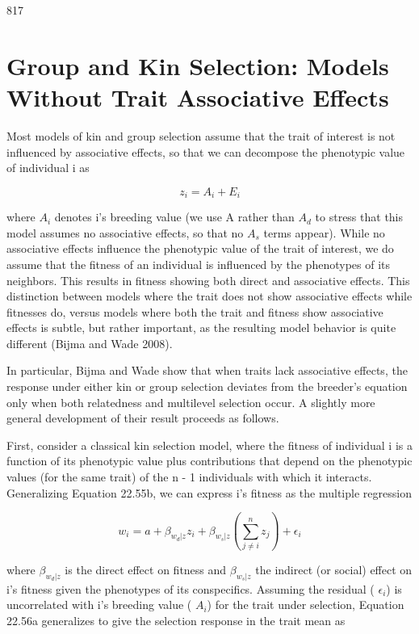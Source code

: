 \documentclass{article}
\begin{document}
817

\section{Group and Kin Selection: Models Without Trait Associative Effects}
Most models of kin and group selection assume that the trait of interest is not influenced by associative effects, so that we can decompose the phenotypic value of individual i as

\begin{equation}
z_{i}=A_{i}+E_{i}
\end{equation}

where  $ A_{i} $ denotes i's breeding value (we use A rather than  $ A_{d} $ to stress that this model assumes no associative effects, so that no  $ A_{s} $ terms appear). While no associative effects influence the phenotypic value of the trait of interest, we do assume that the fitness of an individual is influenced by the phenotypes of its neighbors. This results in fitness showing both direct and associative effects. This distinction between models where the trait does not show associative effects while fitnesses do, versus models where both the trait and fitness show associative effects is subtle, but rather important, as the resulting model behavior is quite different (Bijma and Wade 2008).

In particular, Bijma and Wade show that when traits lack associative effects, the response under either kin or group selection deviates from the breeder's equation only when both relatedness and multilevel selection occur. A slightly more general development of their result proceeds as follows.

First, consider a classical kin selection model, where the fitness of individual i is a function of its phenotypic value plus contributions that depend on the phenotypic values (for the same trait) of the n - 1 individuals with which it interacts. Generalizing Equation 22.55b, we can express i's fitness as the multiple regression

\begin{equation}
w_{i}=a+\beta_{w_{d}|z}z_{i}+\beta_{w_{s}|z}\left(\sum_{j\neq i}^{n}z_{j}\right)+\epsilon_{i}
\tag{22.59a}
\label{eq:22_59a}
\end{equation}

where  $ \beta_{w_d|z} $ is the direct effect on fitness and  $ \beta_{w_s|z} $ the indirect (or social) effect on i's fitness given the phenotypes of its conspecifics. Assuming the residual ( $ \epsilon_i $) is uncorrelated with i's breeding value ( $ A_i $) for the trait under selection, Equation 22.56a generalizes to give the selection response in the trait mean as
\end{document}
